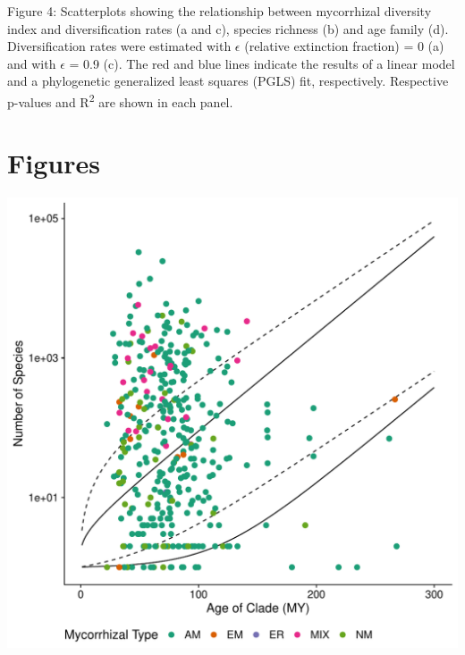 \documentclass[12pt,]{article}
\begin{document}
Figure 4: Scatterplots showing the relationship between mycorrhizal
diversity index and diversification rates (a and c), species richness
(b) and age family (d). Diversification rates were estimated with
\(\epsilon\) (relative extinction fraction) = 0 (a) and with
\(\epsilon\) = 0.9 (c). The red and blue lines indicate the results of a
linear model and a phylogenetic generalized least squares (PGLS) fit,
respectively. Respective p-values and R\textsuperscript{2} are shown in
each panel.

\newpage

\hypertarget{figures}{%
\section{Figures}\label{figures}}

\includegraphics{../output/figs/magsand_stem_nolabel.pdf}

\newpage
\end{document}

